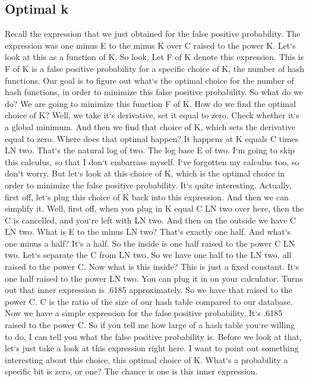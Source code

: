 \subsection{Optimal k}
Recall the expression that we just obtained for the false positive probability.
The expression was one minus E to the minus K over C raised to the power K\@.
Let`s look at this as a function of K\@.
So look, Let F of K denote this expression.
This is F of K is a false positive probability for a specific choice of K, the number of hash functions.
Our goal is to figure out what`s the optimal choice for the number of hash functions, in order to minimize this false positive probability.
So what do we do? We are going to minimize this function F of K\@.
How do we find the optimal choice of K? Well, we take it`s derivative, set it equal to zero.
Check whether it`s a global minimum.
And then we find that choice of K, which sets the derivative equal to zero.
Where does that optimal happen? It happens at K equals C times LN two.
That`s the natural log of two.
The log base E of two.
I`m going to skip this calculus, so that I don`t embarrass myself.
I`ve forgotten my calculus too, so don`t worry.
But let`s look at this choice of K, which is the optimal choice in order to minimize the false positive probability.
It`s quite interesting.
Actually, first off, let`s plug this choice of K back into this expression.
And then we can simplify it.
Well, first off, when you plug in K equal C LN two over here, then the C is cancelled, and you`re left with LN two.
And then on the outside we have C LN two.
What is E to the minus LN two? That`s exactly one half.
And what`s one minus a half? It`s a half.
So the inside is one half raised to the power C LN two.
Let`s separate the C from LN two.
So we have one half to the LN two, all raised to the power C\@.
Now what is this inside? This is just a fixed constant.
It`s one half raised to the power LN two.
You can plug it in on your calculator.
Turns out that inner expression is .6185 approximately.
So we have that raised to the power C\@.
C is the ratio of the size of our hash table compared to our database.
Now we have a simple expression for the false positive probability.
It`s .6185 raised to the power C\@.
So if you tell me how large of a hash table you`re willing to do, I can tell you what the false positive probability is.
Before we look at that, let`s just take a look at this expression right here.
I want to point out something interesting about this choice, this optimal choice of K\@.
What`s a probability a specific bit is zero, or one? The chance is one is this inner expression.
